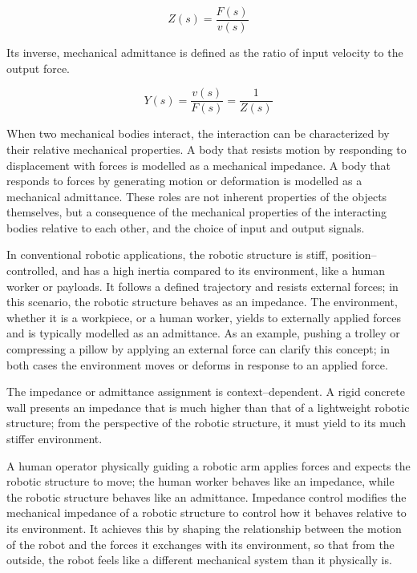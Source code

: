 \documentclass[11pt,a4paper,twoside,openright]{book}
\begin{document}
\begin{equation}
    Z(s) = \frac{F(s)}{v(s)}
    \label{eq:impedance_definition}
\end{equation}

Its inverse, mechanical admittance is defined as the ratio of input velocity to the output force.

\begin{equation}
    Y(s) = \frac{v(s)}{F(s)} = \frac{1}{Z(s)}
    \label{eq:admittance_definition}
\end{equation}

When two mechanical bodies interact, the interaction can be characterized by their relative mechanical properties. A body that resists motion by responding to displacement with forces is modelled as a mechanical impedance. A body that responds to forces by generating motion or deformation is modelled as a mechanical admittance. These roles are not inherent properties of the objects themselves, but a consequence of the mechanical properties of the interacting bodies relative to each other, and the choice of input and output signals. 

In conventional robotic applications, the robotic structure is stiff, position--controlled, and has a high inertia compared to its environment, like a human worker or payloads. It follows a defined trajectory and resists external forces; in this scenario, the robotic structure behaves as an impedance. The environment, whether it is a workpiece, or a human worker, yields to externally applied forces and is typically modelled as an admittance. As an example, pushing a trolley or compressing a pillow by applying an external force can clarify this concept; in both cases the environment moves or deforms in response to an applied force. 

The impedance or admittance assignment is context--dependent. A rigid concrete wall presents an impedance that is much higher than that of a lightweight robotic structure; from the perspective of the robotic structure, it must yield to its much stiffer environment. 

A human operator physically guiding a robotic arm applies forces and expects the robotic structure to move; the human worker behaves like an impedance, while the robotic structure behaves like an admittance. Impedance control modifies the mechanical impedance of a robotic structure to control how it behaves relative to its environment. It achieves this by shaping the relationship between the motion of the robot and the forces it exchanges with its environment, so that from the outside, the robot feels like a different mechanical system than it physically is.
\end{document}
